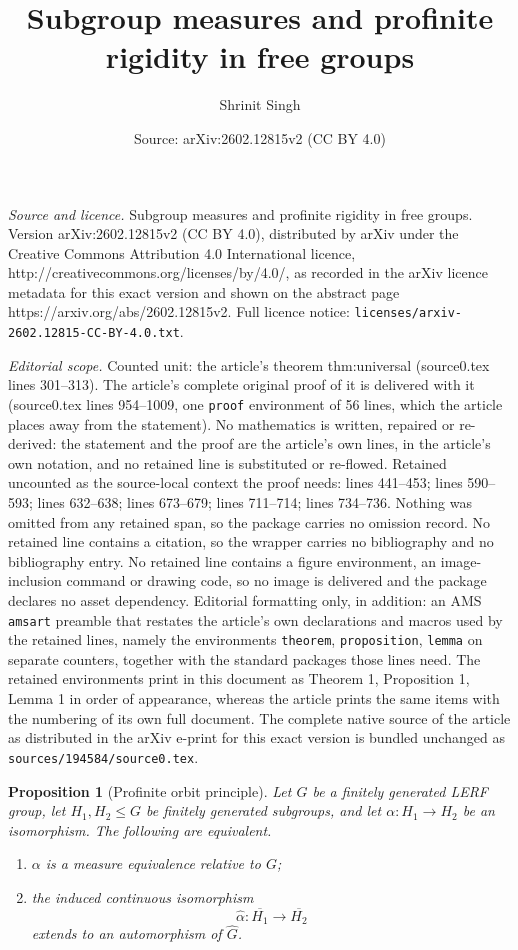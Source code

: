 \documentclass[10pt,a4paper]{amsart}
\title{Subgroup measures and profinite rigidity in free groups}
\author{Shrinit Singh}
\date{Source: arXiv:2602.12815v2 (CC BY 4.0)}
\newtheorem{proposition}{Proposition}
\begin{document}
\maketitle

\noindent\emph{Source and licence.} Subgroup measures and profinite rigidity in free groups. Version arXiv:2602.12815v2 (CC BY 4.0), distributed by arXiv under the Creative Commons Attribution 4.0 International licence, http://creativecommons.org/licenses/by/4.0/, as recorded in the arXiv licence metadata for this exact version and shown on the abstract page https://arxiv.org/abs/2602.12815v2. Full licence notice: \texttt{licenses/arxiv-2602.12815-CC-BY-4.0.txt}.\par\smallskip

\noindent\textit{Editorial scope.} Counted unit: the article's theorem thm:universal (source0.tex lines 301--313). The article's complete original proof of it is delivered with it (source0.tex lines 954--1009, one \texttt{proof} environment of 56 lines, which the article places away from the statement). No mathematics is written, repaired or re-derived: the statement and the proof are the article's own lines, in the article's own notation, and no retained line is substituted or re-flowed.  Retained uncounted as the source-local context the proof needs: lines 441--453; lines 590--593; lines 632--638; lines 673--679; lines 711--714; lines 734--736.  Nothing was omitted from any retained span, so the package carries no omission record.  No retained line contains a citation, so the wrapper carries no bibliography and no bibliography entry.  No retained line contains a figure environment, an image-inclusion command or drawing code, so no image is delivered and the package declares no asset dependency.  Editorial formatting only, in addition: an AMS \texttt{amsart} preamble that restates the article's own declarations and macros used by the retained lines, namely the environments \texttt{theorem}, \texttt{proposition}, \texttt{lemma} on separate counters, together with the standard packages those lines need.  The retained environments print in this document as Theorem 1, Proposition 1, Lemma 1 in order of appearance, whereas the article prints the same items with the numbering of its own full document.  The complete native source of the article as distributed in the arXiv e-print for this exact version is bundled unchanged as \texttt{sources/194584/source0.tex}.
\begin{proposition}[Profinite orbit principle]\label{prop:lerf}
Let $G$ be a finitely generated LERF group, let $H_1,H_2\le G$ be finitely
generated subgroups, and let $\alpha\colon H_1\to H_2$ be an isomorphism.  The
following are equivalent.
\begin{enumerate}
\item[(i)] $\alpha$ is a measure equivalence relative to $G$;
\item[(ii)] the induced continuous isomorphism
\[
  \widehat\alpha\colon\overline{H_1}\longrightarrow\overline{H_2}
\]
extends to an automorphism of $\widehat G$.
\end{enumerate}
\end{proposition}
\end{document}
